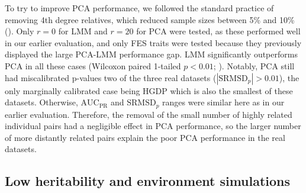 \documentclass[9pt,lineno]{elife}
\newcommand{\rmsd}{\text{SRMSD}_p}
\newcommand{\auc}{\text{AUC}_\text{PR}}
\begin{document}
To try to improve PCA performance, we followed the standard practice of removing 4th degree relatives, which reduced sample sizes between 5\% and 10\% ().
Only $r=0$ for LMM and $r=20$ for PCA were tested, as these performed well in our earlier evaluation, and only FES traits were tested because they previously displayed the large PCA-LMM performance gap.
LMM significantly outperforms PCA in all these cases (Wilcoxon paired 1-tailed $p < 0.01$; ).
Notably, PCA still had miscalibrated p-values two of the three real datasets ($|\rmsd| > 0.01$), the only marginally calibrated case being HGDP which is also the smallest of these datasets.
Otherwise, $\auc$ and $\rmsd$ ranges were similar here as in our earlier evaluation.
Therefore, the removal of the small number of highly related individual pairs had a negligible effect in PCA performance, so the larger number of more distantly related pairs explain the poor PCA performance in the real datasets.

\subsection{Low heritability and environment simulations}
\end{document}
